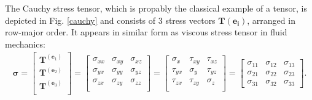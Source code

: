 \documentclass{scrartcl}
\begin{document}
The Cauchy stress tensor, which is propably the classical example of a tensor, is depicted in Fig. \ref{cauchy} and consists of 3 stress vectors $\mathbf{T(e_i)}$, arranged in row-major order. It appears in similar form as viscous stress tensor in fluid mechanics:
\begin{align*}
\boldsymbol{\sigma}
 = \left[{\begin{matrix} \mathbf{T}^{(\mathbf{e}_1)} \\
\boldsymbol{T}^{(\mathbf{e}_2)} \\
\boldsymbol{T}^{(\mathbf{e}_3)} \\
\end{matrix}}\right] =
\left[{\begin{matrix}
\sigma _{xx} & \sigma _{xy} & \sigma _{xz} \\
\sigma _{yx} & \sigma _{yy} & \sigma _{yz} \\
\sigma _{zx} & \sigma _{zy} & \sigma _{zz} \\
\end{matrix}}\right]  = \left[{\begin{matrix}
\sigma _x & \tau _{xy} & \tau _{xz} \\
\tau _{yx} & \sigma _y & \tau _{yz} \\
\tau _{zx} & \tau _{zy} & \sigma _z \\
\end{matrix}}\right] =
\begin{bmatrix}
\sigma _{11} & \sigma _{12} & \sigma _{13} \\
\sigma _{21} & \sigma _{22} & \sigma _{23} \\
\sigma _{31} & \sigma _{32} & \sigma _{33} 
\end{bmatrix}.
\end{align*}
\end{document}

